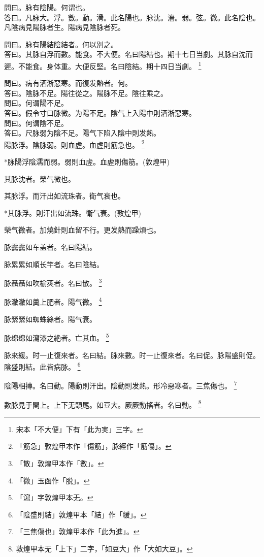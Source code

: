 \documentclass[12pt,twoside,UTF8,b5paper]{ctexbook}
\begin{document}
問曰。脉有陰陽。何谓也。\\
答曰。凡脉大。浮。數。動。滑。此名陽也。脉沈。濇。弱。弦。微。此名陰也。凡陰病見陽脉者生。陽病見陰脉者死。

問曰。脉有陽結陰結者。何以別之。\\
答曰。其脉{自}浮而數。能食。不大便。名曰陽結也。期十七日当劇。其脉{自}沈而遲。不能食。身体重。大便反堅。名曰陰結。期十四日当劇。
	\footnote{宋本「不大便」下有「此为実」三字。}

問曰。病有洒淅惡寒。而復发熱者。何。\\
答曰。陰脉不足。陽往從之。陽脉不足。陰往乘之。\\
問曰。何谓陽不足。\\
答曰。假令寸口脉微。为陽不足。陰气上入陽中則洒淅惡寒。\\
問曰。何谓陰不足。\\
答曰。尺脉弱为陰不足。陽气下陷入陰中則发熱。\\

陽脉浮。陰脉弱。則血虗。血虗則筋急也。
	\footnote{「筋急」敦煌甲本作「傷筋」，脉經作「筋傷」。}

*脉陽浮陰濡而弱。弱則血虗。血虗則傷筋。(敦煌甲)

其脉沈者。榮气微也。

其脉浮。而汗出如流珠者。衛气衰也。

*其脉浮。則汗出如流珠。衛气衰。(敦煌甲)

榮气微者。加燒針則血留不行。更发熱而躁煩也。

脉靄靄如车盖者。名曰陽結。

脉累累如順长竿者。名曰陰結。

脉聶聶如吹榆莢者。名曰散。
	\footnote{「散」敦煌甲本作「數」。}

脉潎潎如羹上肥者。陽气微。
	\footnote{「微」玉函作「脱」。}

脉縈縈如蜘蛛絲者。陽气衰。

脉绵绵如{瀉}漆之絶者。亡其血。
	\footnote{「瀉」字敦煌甲本无。}

脉來緩。时一止復來者。名曰結。脉來數。时一止復來者。名曰促。脉陽盛則促。陰盛則結。此皆病脉。
	\footnote{「陰盛則結」敦煌甲本「結」作「緩」。}

陰陽相摶。名曰動。陽動則汗出。陰動則发熱。形冷惡寒者。三焦傷也。
	\footnote{「三焦傷也」敦煌甲本作「此为進」。}

數脉見于関上。{上下}无頭尾。如豆大。厥厥動搖者。名曰動。
	\footnote{敦煌甲本无「上下」二字，「如豆大」作「大如大豆」。}
\end{document}
